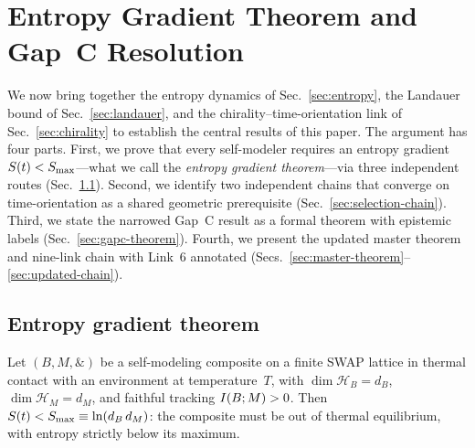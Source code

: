 
\section{Entropy Gradient Theorem and Gap~C
  Resolution}\label{sec:gradient-gapc}
\label{sec:gradient}%

We now bring together the entropy dynamics of
Sec.~\ref{sec:entropy}, the Landauer bound of
Sec.~\ref{sec:landauer}, and the chirality--time-orientation link of
Sec.~\ref{sec:chirality} to establish the central results of this
paper.  The argument has four parts.  First, we prove that every
self-modeler requires an entropy gradient $S(t) < S_{\max}$---what we
call the \emph{entropy gradient theorem}---via three independent
routes (Sec.~\ref{sec:egt}).  Second, we identify two independent
chains that converge on time-orientation as a shared geometric
prerequisite (Sec.~\ref{sec:selection-chain}).  Third, we state the
narrowed Gap~C result as a formal theorem with epistemic labels
(Sec.~\ref{sec:gapc-theorem}).  Fourth, we present the updated master
theorem and nine-link chain with Link~6 annotated
(Secs.~\ref{sec:master-theorem}--\ref{sec:updated-chain}).

\subsection{Entropy gradient theorem}\label{sec:egt}

\begin{theorem}\label{thm:entropy-gradient}
Let $(B,M,\mathbin{\&})$ be a self-modeling composite on a finite
SWAP lattice in thermal contact with an environment at
temperature~$T$, with $\dim\mathcal{H}_B = d_B$,
$\dim\mathcal{H}_M = d_M$, and faithful tracking
$I(B;M) > 0$.  Then $S(t) < S_{\max} \equiv \ln(d_B\,d_M)$: the
composite must be out of thermal equilibrium, with entropy strictly
below its maximum.
\end{theorem}

